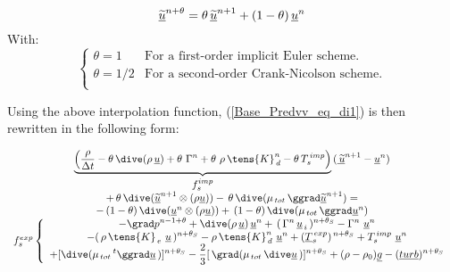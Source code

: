 \begin{equation}
\underline {\widetilde{u}}^{n+\theta}=\theta\, \underline
{\widetilde{u}}^{n+1}+(1-\theta)\, \underline {u}^{n}\\
\end{equation}
With:
\begin{equation}
\left\{
\begin{array}{ll}
\theta = 1   & \text{For a first-order implicit Euler scheme.}\\
\theta = 1/2 & \text{For a second-order Crank-Nicolson scheme.}\\
\end{array}
\right.
\end{equation}

Using the above interpolation function, (\ref{Base_Predvv_eq_di1}) is then rewritten in the following form:

\begin{equation}\label{Base_Predvv_eq_di2}
\begin{array}{c}
\displaystyle \underbrace{\left(\frac{\rho}{\Delta t} -\theta \,\dive (\rho\,\underline {u}) +\theta \,\, \Gamma^n +
\theta \,\, \rho\,\tens{K}_{\,d}^n-\theta \,T_s^{\,imp} \right)}_{\displaystyle f_s^{imp}}\, (\underline {\,\widetilde{u}}^{n+1} -\underline {u}^{n})
\\
 +\, \theta\, \dive(\underline {\widetilde{u}}^{n+1} \otimes (\rho\underline{u}))-\, \theta\,\dive (\mu_{\,tot}\,\ggrad \underline {\widetilde{u}}^{n+1}) =
\\
-\,(1-\theta)\, \dive(\underline {u}^{n} \otimes (\rho\underline{u})) +\,(1-\theta)\,\dive (\mu_{\,tot}\,\ggrad \underline {u}^{n})
\\
f_s^{exp}\left\{
\begin{array}{c}
\displaystyle
- \grad p^{n-1+\theta} + \dive (\rho\,\underline {u})\,\underline{u}^{n} +\,(\,\Gamma^{n}\,\underline{u}_{\,i}\,)^{n+\theta_S}- \Gamma^n\,\,\underline{u}^{n}
\\
\displaystyle
-(\,\rho\,\tens{K}_{\,e}\ \underline{u}\,)^{n+\theta_S} -\rho\,\tens{K}_{\,d}^n\ \underline{u}^{n}+ (\underline{T}_{s}^{\,exp})^{\,n+\theta_S} + T_s^{\,imp}\,\,\underline {u}^{n}
\\
\displaystyle
+[\dive (\mu_{\,tot}\,^t\ggrad \underline {u}\,)]^{n+\theta_S}-\frac {2} {3}[\,\grad (\mu_{\,tot}\,\dive \underline {u}\,)]^{n+\theta_S} + (\rho -\rho_0) \underline {g}-(\underline{turb})^{n+\theta_S}
\end{array}
\right.
\end{array}
\end{equation}

